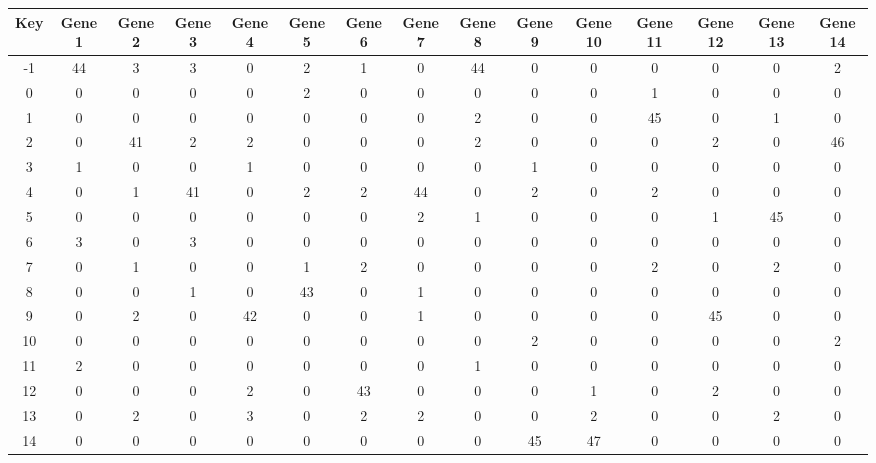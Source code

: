 \begin{tabular}{|c|c|c|c|c|c|c|c|c|c|c|c|c|c|c|}
\hline
Key & Gene 1 & Gene 2 & Gene 3 & Gene 4 & Gene 5 & Gene 6 & Gene 7 & Gene 8 & Gene 9 & Gene 10 & Gene 11 & Gene 12 & Gene 13 & Gene 14 \\
\hline
-1 & 44 & 3 & 3 & 0 & 2 & 1 & 0 & 44 & 0 & 0 & 0 & 0 & 0 & 2 \\
0 & 0 & 0 & 0 & 0 & 2 & 0 & 0 & 0 & 0 & 0 & 1 & 0 & 0 & 0 \\
1 & 0 & 0 & 0 & 0 & 0 & 0 & 0 & 2 & 0 & 0 & 45 & 0 & 1 & 0 \\
2 & 0 & 41 & 2 & 2 & 0 & 0 & 0 & 2 & 0 & 0 & 0 & 2 & 0 & 46 \\
3 & 1 & 0 & 0 & 1 & 0 & 0 & 0 & 0 & 1 & 0 & 0 & 0 & 0 & 0 \\
4 & 0 & 1 & 41 & 0 & 2 & 2 & 44 & 0 & 2 & 0 & 2 & 0 & 0 & 0 \\
5 & 0 & 0 & 0 & 0 & 0 & 0 & 2 & 1 & 0 & 0 & 0 & 1 & 45 & 0 \\
6 & 3 & 0 & 3 & 0 & 0 & 0 & 0 & 0 & 0 & 0 & 0 & 0 & 0 & 0 \\
7 & 0 & 1 & 0 & 0 & 1 & 2 & 0 & 0 & 0 & 0 & 2 & 0 & 2 & 0 \\
8 & 0 & 0 & 1 & 0 & 43 & 0 & 1 & 0 & 0 & 0 & 0 & 0 & 0 & 0 \\
9 & 0 & 2 & 0 & 42 & 0 & 0 & 1 & 0 & 0 & 0 & 0 & 45 & 0 & 0 \\
10 & 0 & 0 & 0 & 0 & 0 & 0 & 0 & 0 & 2 & 0 & 0 & 0 & 0 & 2 \\
11 & 2 & 0 & 0 & 0 & 0 & 0 & 0 & 1 & 0 & 0 & 0 & 0 & 0 & 0 \\
12 & 0 & 0 & 0 & 2 & 0 & 43 & 0 & 0 & 0 & 1 & 0 & 2 & 0 & 0 \\
13 & 0 & 2 & 0 & 3 & 0 & 2 & 2 & 0 & 0 & 2 & 0 & 0 & 2 & 0 \\
14 & 0 & 0 & 0 & 0 & 0 & 0 & 0 & 0 & 45 & 47 & 0 & 0 & 0 & 0 \\
\hline
\end{tabular}
